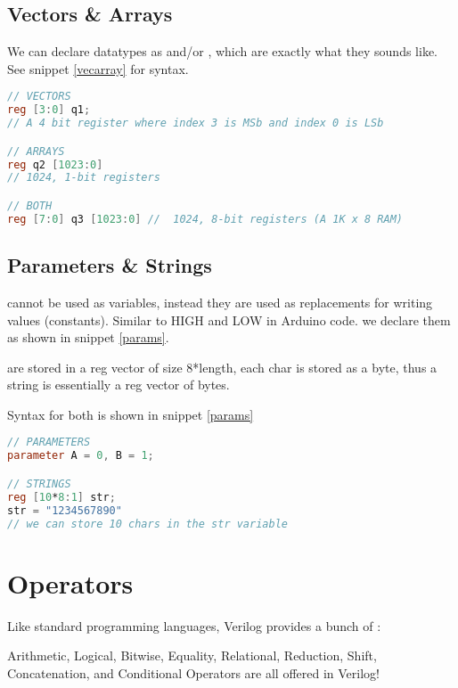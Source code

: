\section{Vectors \& Arrays}

We can declare datatypes as  and/or , which are exactly what they sounds like. See snippet \ref{vecarray} for syntax.
\begin{marginfigure}\begin{lstlisting}[language=Verilog, caption={Vectors \& Arrays}, label=vecarray]
// VECTORS
reg [3:0] q1; 
// A 4 bit register where index 3 is MSb and index 0 is LSb

// ARRAYS
reg q2 [1023:0] 
// 1024, 1-bit registers

// BOTH
reg [7:0] q3 [1023:0] //  1024, 8-bit registers (A 1K x 8 RAM)
\end{lstlisting}\end{marginfigure}

\section{Parameters \& Strings}

 cannot be used as variables, instead they are used as replacements for writing values (constants). Similar to HIGH and LOW in Arduino code.
we declare them as shown in snippet \ref{params}.

 are stored in a reg vector of size 8*length, each char is stored as a byte, thus a string is essentially a reg vector of bytes.

Syntax for both is shown in snippet \ref{params}

\begin{marginfigure}\begin{lstlisting}[language=Verilog, caption={parameters}, label=params]
// PARAMETERS
parameter A = 0, B = 1;

// STRINGS
reg [10*8:1] str;
str = "1234567890" 
// we can store 10 chars in the str variable
\end{lstlisting}\end{marginfigure}

\chapter{Operators}

Like standard programming languages, Verilog provides a bunch of :
\begin{bullets}
	\item Arithmetic, Logical, Bitwise, Equality, Relational, Reduction, Shift, Concatenation, and Conditional Operators are all offered in Verilog!
\end{bullets}

